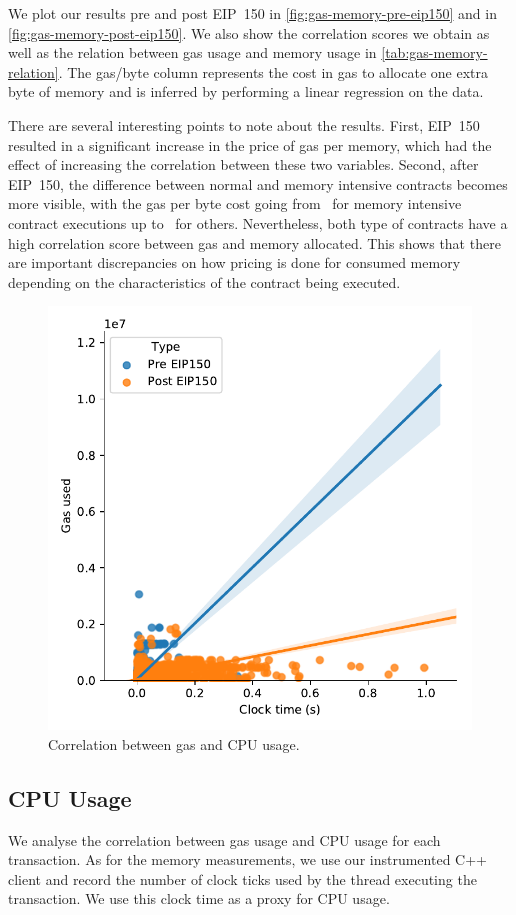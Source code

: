 We plot our results pre and post EIP~150 in \autoref{fig:gas-memory-pre-eip150} and in \autoref{fig:gas-memory-post-eip150}. We also show the correlation scores we obtain as well as the relation between gas usage and memory usage in \autoref{tab:gas-memory-relation}. The gas/byte column represents the cost in gas to allocate one extra byte of memory and is inferred by performing a linear regression on the data.

There are several interesting points to note about the results. First, EIP~150 resulted in a significant increase in the price of gas per memory, which had the effect of increasing the correlation between these two variables. Second, after EIP~150, the difference between normal and memory intensive contracts becomes more visible, with the gas per byte cost going from~ for memory intensive contract executions up to~ for others. Nevertheless, both type of contracts have a high correlation score between gas and memory allocated. This shows that there are important discrepancies on how pricing is done for consumed memory depending on the characteristics of the contract being executed.

\begin{figure}[tb]
	\centering\includegraphics[width=.8\columnwidth]{figures/cpu-usage-1400000-1500000--2500000-2600000.pdf}
	\caption{Correlation between gas and CPU usage.}
	\label{fig:gas-cpu}
\end{figure}

\subsection{CPU Usage}
We analyse the correlation between gas usage and CPU usage for each transaction. As for the memory measurements, we use our instrumented C++ client and record the number of clock ticks used by the thread executing the transaction. We use this clock time as a proxy for CPU usage.

